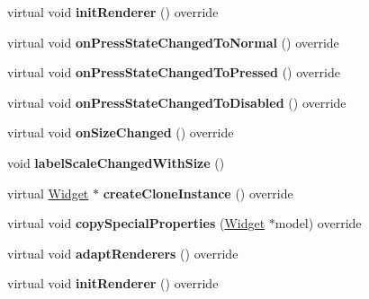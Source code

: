 \begin{DoxyCompactItemize}
\item 
\mbox{\label{classui_1_1Text_a24c6086be66a88739e38fba83299b36d}} 
virtual void {\bfseries init\+Renderer} () override
\item 
\mbox{\label{classui_1_1Text_a123b6adc7e7006774ebaa9f2c39f21ee}} 
virtual void {\bfseries on\+Press\+State\+Changed\+To\+Normal} () override
\item 
\mbox{\label{classui_1_1Text_a5501538181a1de4f232b923894ce0dcc}} 
virtual void {\bfseries on\+Press\+State\+Changed\+To\+Pressed} () override
\item 
\mbox{\label{classui_1_1Text_ab6094a84da1196a6bfe8999dddfe8187}} 
virtual void {\bfseries on\+Press\+State\+Changed\+To\+Disabled} () override
\item 
\mbox{\label{classui_1_1Text_a3fd8439887d367a7030d9099621b37b6}} 
virtual void {\bfseries on\+Size\+Changed} () override
\item 
\mbox{\label{classui_1_1Text_afa366fe27a0976a1a4d937852a6c6b5c}} 
void {\bfseries label\+Scale\+Changed\+With\+Size} ()
\item 
\mbox{\label{classui_1_1Text_a554ee32ed727f36f3b16fd641609bcb1}} 
virtual \hyperlink{classui_1_1Widget}{Widget} $\ast$ {\bfseries create\+Clone\+Instance} () override
\item 
\mbox{\label{classui_1_1Text_a57d7935393581a1f33f40170b123d5e8}} 
virtual void {\bfseries copy\+Special\+Properties} (\hyperlink{classui_1_1Widget}{Widget} $\ast$model) override
\item 
\mbox{\label{classui_1_1Text_aa2631ae1c249c31a496f8b889870eaad}} 
virtual void {\bfseries adapt\+Renderers} () override
\item 
\mbox{\label{classui_1_1Text_af66fafe003458de669c8d1536badb059}} 
virtual void {\bfseries init\+Renderer} () override
\item 
\mbox{\label{classui_1_1Text_a9301b635bfa60db2249192c80f334b60}} 

\end{DoxyCompactItemize}

